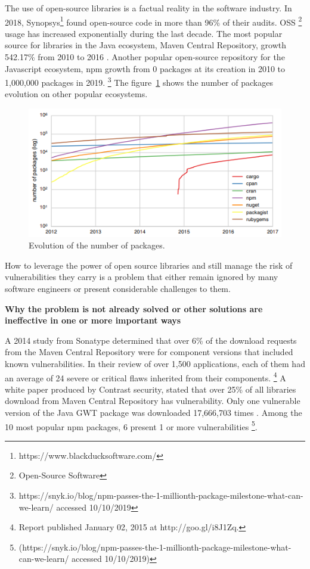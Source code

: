 \documentclass[pdf,bookmarks,colorlinks=true]{IEEEtran}
\begin{document}
The use of open-source libraries is a factual reality in the software industry. In 2018, Synopsys\footnote{https://www.blackducksoftware.com/} found open-source code in more than 96\% of their audits\cite{Synopsys2019}. OSS \footnote{Open-Source Software} usage has increased exponentially during the last decade. The most popular source for libraries in the Java ecosystem, Maven Central Repository, growth 542.17\% from 2010 to 2016 \cite{Kula2018}. Another popular open-source repository for the Javascript ecosystem, npm growth from 0 packages at its creation in 2010 to 1,000,000 packages in 2019. \footnote{https://snyk.io/blog/npm-passes-the-1-millionth-package-milestone-what-can-we-learn/ accessed 10/10/2019}  
The figure~\ref{PackageEvolution}\cite{Decan} shows the number of packages evolution on other popular ecosystems.
\begin{figure}[h]
	\centering
	\includegraphics[scale=0.70]{PackagesEvolution.png}
	\caption{Evolution of the number of packages.}
	\label{PackageEvolution}
\end{figure}
How to leverage the power of open source libraries and still manage the risk of vulnerabilities they carry is a problem that either remain ignored by many software engineers or present considerable challenges to them.



\textbf{Why the problem is not already solved or other solutions
are ineffective in one or more important ways}

A 2014 study from Sonatype determined that over 6\% of the download requests from the Maven Central Repository were for component versions that included known vulnerabilities. In their review of over 1,500 applications, each of them had an average of 24 severe or critical flaws inherited from their components. \footnote{Report published January 02, 2015 at http://goo.gl/i8J1Zq.}
A white paper produced by Contrast security, stated that over 25\% of all libraries download from Maven Central Repository has vulnerability. Only one vulnerable version of the Java GWT package was downloaded 17,666,703 times \cite{williams2012unfortunate}.
Among the 10 most popular npm packages, 6 present 1 or more vulnerabilities \footnote{(https://snyk.io/blog/npm-passes-the-1-millionth-package-milestone-what-can-we-learn/ accessed 10/10/2019)}.
\end{document}
